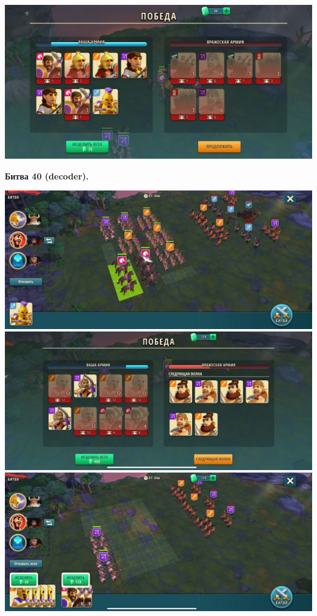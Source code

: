 \noindent\includegraphics[width=\linewidth]{./parts/media/TreasureHunt/39/sargon/photo_2022-04-07_13-18-31.jpg} \newline

\newpage
\begin{center}
	\hypertarget{fight40}{\textbf{Битва 40 (decoder).}}
\end{center}
\noindent\includegraphics[width=\linewidth]{./parts/media/TreasureHunt/40/decoder/photo_2022-04-07_13-15-51.jpg} \newline
\noindent\includegraphics[width=\linewidth]{./parts/media/TreasureHunt/40/decoder/photo_2022-04-07_13-16-08.jpg} \newline
\noindent\includegraphics[width=\linewidth]{./parts/media/TreasureHunt/40/decoder/photo_2022-04-07_13-16-12.jpg} \newline
